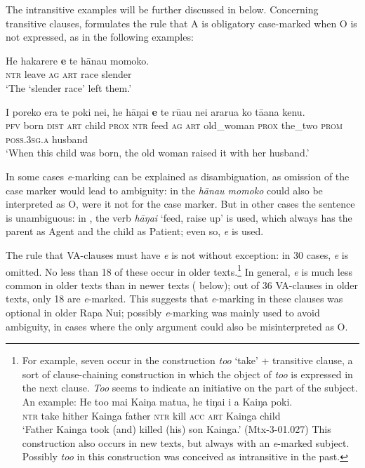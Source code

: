 The intransitive examples will be further discussed in  below. Concerning transitive clauses, \citet{WeberN2003} formulates the rule that A is obligatory case-marked when O is not expressed, as in the following examples:

\ea\label{ex:8.11}
\gll He hakarere \textbf{e} te hānau momoko. \\
\textsc{ntr} leave \textsc{ag} \textsc{art} race slender \\

\glt 
‘The ‘slender race’ left them.’ \textstyleExampleref{[Ley-3-06.044]}
\z

\ea\label{ex:8.12}
\gll I poreko era te poki nei, he hāŋai \textbf{e} te rū{\ꞌ}au nei ararua ko tā{\ꞌ}ana kenu.\\
\textsc{pfv} born \textsc{dist} \textsc{art} child \textsc{prox} \textsc{ntr} feed \textsc{ag} \textsc{art} old\_woman \textsc{prox} the\_two \textsc{prom} \textsc{poss.3sg.a} husband\\

\glt
‘When this child was born, the old woman raised it with her husband.’ \textstyleExampleref{[R352.005]} 
\z

In some cases \textit{e}{}-marking can be explained as disambiguation, as omission of the case marker would lead to ambiguity: in  the \textit{hānau momoko} could also be interpreted as O, were it not for the case marker. But in other cases the sentence is unambiguous: in , the verb \textit{hāŋai} ‘feed, raise up’ is used, which always has the parent as Agent and the child as Patient; even so, \textit{e} is used. 

The rule that VA-clauses must have \textit{e} is not without exception: in 30 cases, \textit{e} is omitted. No less than 18 of these occur in older texts.\footnote{\label{fn:391}For example, seven occur in the construction \textit{to{\ꞌ}o} ‘take’ + transitive clause, a sort of clause-chaining construction in which the object of \textit{to{\ꞌ}o} is expressed in the next clause. \textit{To{\ꞌ}o} seems to indicate an initiative on the part of the subject. An example:
\ea
\gll  He to{\ꞌ}o mai Kaiŋa matu{\ꞌ}a, he tiŋa{\ꞌ}i i a Kaiŋa poki.\\
  \textsc{ntr} take hither Kainga father \textsc{ntr} kill \textsc{acc} \textsc{art} Kainga child\\
  \glt 
  ‘Father Kainga took (and) killed (his) son Kainga.’ (Mtx-3-01.027)
  \z
This construction also occurs in new texts, but always with an \textit{e}{}-marked subject. Possibly \textit{to{\ꞌ}o} in this construction was conceived as intransitive in the past.} In general, \textit{e} is much less common in older texts than in newer texts ( below); out of 36 VA\nobreakdash-clauses in older texts, only 18 are \textit{e}{}-marked. This suggests that \textit{e}{}-marking in these clauses was optional in older Rapa Nui; possibly \textit{e}{}-marking was mainly used to avoid ambiguity, in cases where the only argument could also be misinterpreted as O. 


